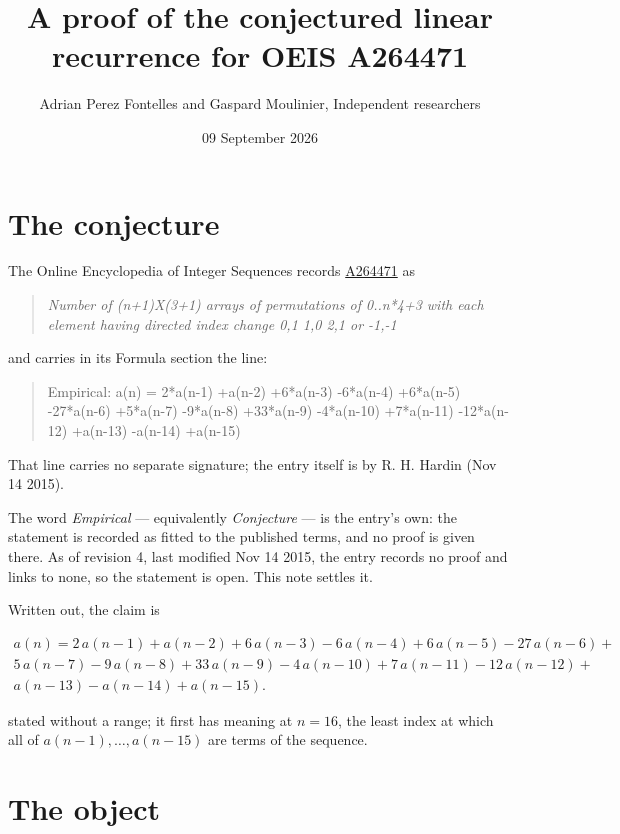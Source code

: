 \documentclass[11pt]{article}
\title{A proof of the conjectured linear recurrence for OEIS A264471}
\author{Adrian Perez Fontelles and Gaspard Moulinier, Independent researchers}
\date{09 September 2026}
\theoremstyle{definition}
\begin{document}
\maketitle
\section{The conjecture}

The Online Encyclopedia of Integer Sequences records \href{https://oeis.org/A264471}{A264471} as

\begin{quote}\itshape Number of (n+1)X(3+1) arrays of permutations of 0..n*4+3 with each element having directed index change 0,1 1,0 2,1 or -1,-1\end{quote}

and carries in its Formula section the line:

\begin{quote}\ttfamily Empirical: a(n) = 2*a(n-1) +a(n-2) +6*a(n-3) -6*a(n-4) +6*a(n-5) -27*a(n-6) +5*a(n-7) -9*a(n-8) +33*a(n-9) -4*a(n-10) +7*a(n-11) -12*a(n-12) +a(n-13) -a(n-14) +a(n-15)\end{quote}

That line carries no separate signature; the entry itself is by R. H. Hardin (Nov 14 2015).

The word {\itshape Empirical} --- equivalently {\itshape Conjecture} --- is the entry's own: the statement is recorded as fitted to the published terms, and no proof is given there. As of revision 4, last modified Nov 14 2015, the entry records no proof and links to none, so the statement is open. This note settles it.

Written out, the claim is

\begin{multline*} a(n) = 2\,a(n-1) + a(n-2) + 6\,a(n-3) - 6\,a(n-4) + 6\,a(n-5) - 27\,a(n-6) + \\ 5\,a(n-7) - 9\,a(n-8) + 33\,a(n-9) - 4\,a(n-10) + 7\,a(n-11) - 12\,a(n-12) + \\ a(n-13) - a(n-14) + a(n-15). \end{multline*}

stated without a range; it first has meaning at $n = 16$, the least index at which all of $a(n-1),\dots,a(n-15)$ are terms of the sequence.

\section{The object}
\end{document}
